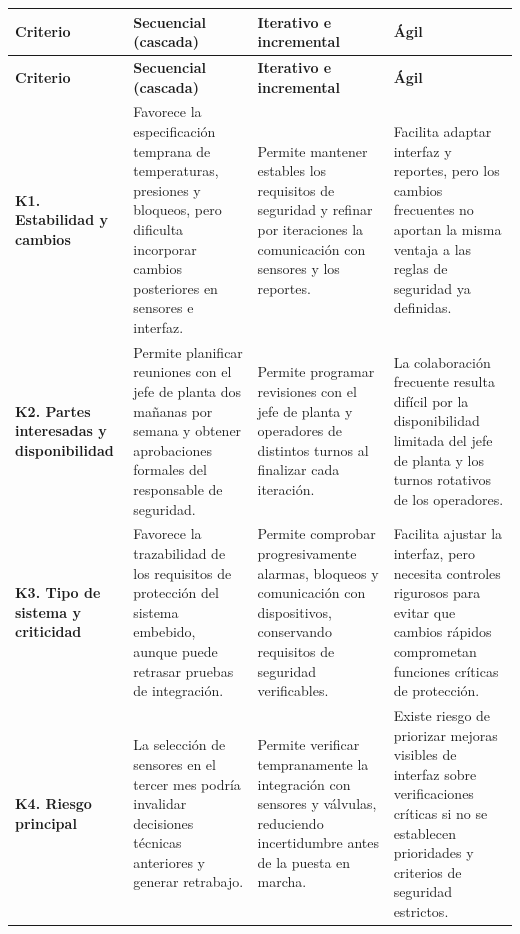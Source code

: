 \begin{longtable}{
|>{\raggedright\arraybackslash}p{}
|>{\raggedright\arraybackslash}p{}
|>{\raggedright\arraybackslash}p{}
|>{\raggedright\arraybackslash}p{}|}
\hline
\textbf{Criterio} &
\textbf{Secuencial (cascada)} &
\textbf{Iterativo e incremental} &
\textbf{Ágil} \\
\hline
\endfirsthead

\hline
\textbf{Criterio} &
\textbf{Secuencial (cascada)} &
\textbf{Iterativo e incremental} &
\textbf{Ágil} \\
\hline
\endhead

\textbf{K1. Estabilidad y cambios} &
Favorece la especificación temprana de temperaturas,
presiones y bloqueos, pero dificulta incorporar
cambios posteriores en sensores e interfaz. &
Permite mantener estables los requisitos de seguridad
y refinar por iteraciones la comunicación con sensores
y los reportes. &
Facilita adaptar interfaz y reportes, pero los cambios
frecuentes no aportan la misma ventaja a las reglas
de seguridad ya definidas. \\
\hline

\textbf{K2. Partes interesadas y disponibilidad} &
Permite planificar reuniones con el jefe de planta
dos mañanas por semana y obtener aprobaciones
formales del responsable de seguridad. &
Permite programar revisiones con el jefe de planta
y operadores de distintos turnos al finalizar
cada iteración. &
La colaboración frecuente resulta difícil por la
disponibilidad limitada del jefe de planta y los
turnos rotativos de los operadores. \\
\hline

\textbf{K3. Tipo de sistema y criticidad} &
Favorece la trazabilidad de los requisitos de
protección del sistema embebido, aunque puede
retrasar pruebas de integración. &
Permite comprobar progresivamente alarmas, bloqueos
y comunicación con dispositivos, conservando
requisitos de seguridad verificables. &
Facilita ajustar la interfaz, pero necesita controles
rigurosos para evitar que cambios rápidos comprometan
funciones críticas de protección. \\
\hline

\textbf{K4. Riesgo principal} &
La selección de sensores en el tercer mes podría
invalidar decisiones técnicas anteriores y
generar retrabajo. &
Permite verificar tempranamente la integración
con sensores y válvulas, reduciendo incertidumbre
antes de la puesta en marcha. &
Existe riesgo de priorizar mejoras visibles de
interfaz sobre verificaciones críticas si no se
establecen prioridades y criterios de seguridad
estrictos. \\
\hline


\end{longtable}
